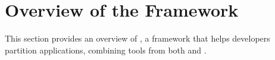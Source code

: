 \section{Overview of the \systemname{} Framework}
\label{sec:overview}

This section provides an overview of \systemname{},
a framework that helps developers partition \java{} applications,
combining tools from both \sgx{} and \java{}.

